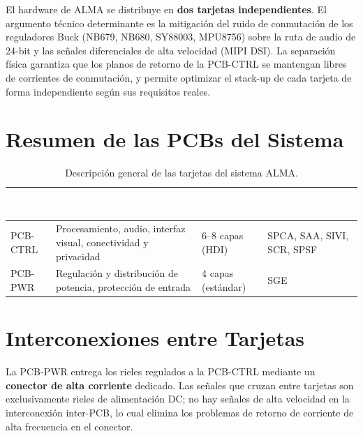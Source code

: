 \begin{decisbox}
  El hardware de ALMA se distribuye en \textbf{dos tarjetas independientes}.
  El argumento técnico determinante es la mitigación del ruido de conmutación de
  los reguladores Buck (NB679, NB680, SY88003, MPU8756) sobre la ruta de audio
  de 24-bit y las señales diferenciales de alta velocidad (MIPI DSI). La separación
  física garantiza que los planos de retorno de la PCB-CTRL se mantengan libres de
  corrientes de conmutación, y permite optimizar el stack-up de cada tarjeta
  de forma independiente según sus requisitos reales.
\end{decisbox}

\section{Resumen de las PCBs del Sistema}
\label{sec:part_resumen}

\begin{table}[H]
  \centering
  \caption{Descripción general de las tarjetas del sistema ALMA.}
  \label{tab:resumen_pcbs}
  \begin{tabularx}{\textwidth}{C{2cm} L{4cm} C{2cm} L{5.5cm}}
    \toprule
    \textcolor{white}{\textbf{PCB}} &
    \textcolor{white}{\textbf{Función principal}} &
    \textcolor{white}{\textbf{Stack-up}} &
    \textcolor{white}{\textbf{Subsistemas alojados}} \\
    \midrule
    PCB-CTRL & Procesamiento, audio, interfaz visual, conectividad y privacidad
              & 6--8 capas (HDI) & SPCA, SAA, SIVI, SCR, SPSF \\
    PCB-PWR  & Regulación y distribución de potencia, protección de entrada
              & 4 capas (estándar) & SGE \\
    \bottomrule
  \end{tabularx}
\end{table}

\section{Interconexiones entre Tarjetas}
\label{sec:part_interconexiones}

La PCB-PWR entrega los rieles regulados a la PCB-CTRL mediante un
\textbf{conector de alta corriente} dedicado. Las señales que cruzan entre tarjetas
son exclusivamente rieles de alimentación DC; no hay señales de alta velocidad
en la interconexión inter-PCB, lo cual elimina los problemas de retorno de
corriente de alta frecuencia en el conector.

